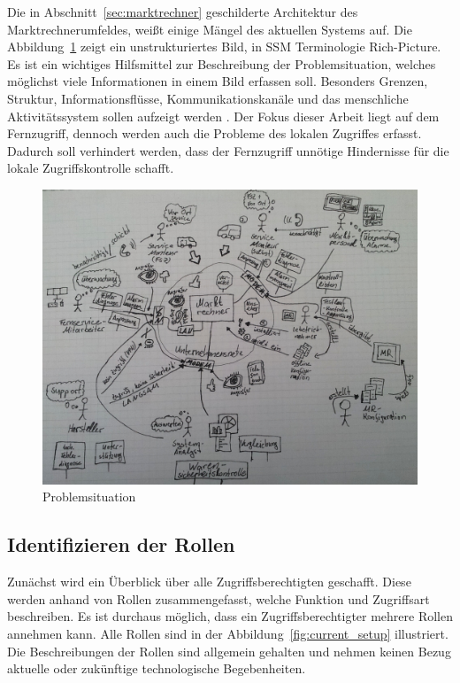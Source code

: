 \documentclass[11pt,a4paper]{report}
\begin{document}
Die in Abschnitt~\ref{sec:marktrechner} geschilderte Architektur des Marktrechnerumfeldes, weißt einige Mängel des aktuellen Systems auf. Die Abbildung~\ref{fig:problem_situation} zeigt ein unstrukturiertes Bild, in SSM Terminologie Rich-Picture. Es ist ein wichtiges Hilfsmittel zur Beschreibung der Problemsituation, welches möglichst viele Informationen in einem Bild erfassen soll. Besonders Grenzen, Struktur, Informationsflüsse, Kommunikationskanäle und das menschliche Aktivitätssystem sollen aufzeigt werden \cite{ssmger}. Der Fokus dieser Arbeit liegt auf dem Fernzugriff, dennoch werden auch die Probleme des lokalen Zugriffes erfasst. Dadurch soll verhindert werden, dass der Fernzugriff unnötige Hindernisse für die lokale Zugriffskontrolle schafft. 

\begin{figure}[htb]
\centering
\includegraphics[scale=0.215]{images/problemsituation.jpg}
\caption{Problemsituation}
\label{fig:problem_situation}
\end{figure}

\subsection{Identifizieren der Rollen} \label{sec:roles}

Zunächst wird ein Überblick über alle Zugriffsberechtigten geschafft. Diese werden anhand von Rollen zusammengefasst, welche Funktion und Zugriffsart beschreiben. Es ist durchaus möglich, dass ein Zugriffsberechtigter mehrere Rollen annehmen kann. Alle Rollen sind in der Abbildung~\ref{fig:current_setup} illustriert. Die Beschreibungen der Rollen sind allgemein gehalten und nehmen keinen Bezug aktuelle oder zukünftige technologische Begebenheiten.
\end{document}
